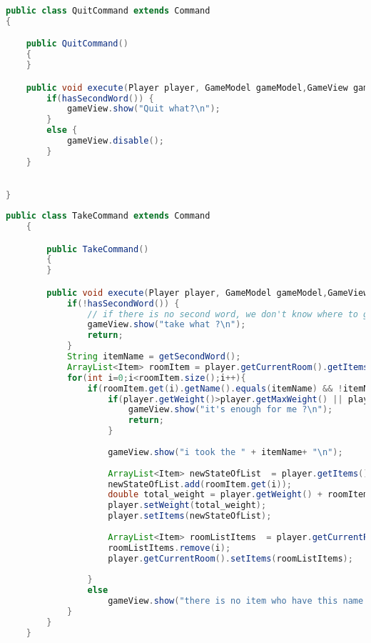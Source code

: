 \documentclass[a4paper , 10pt]{article}
\begin{document}
\begin{lstlisting}[language=Java, caption={Quitcommand}]
    public class QuitCommand extends Command
{

    public QuitCommand()
    {
    }

    public void execute(Player player, GameModel gameModel,GameView gameView){
        if(hasSecondWord()) {
            gameView.show("Quit what?\n");
        }
        else {
            gameView.disable();    
        }
    }

    
}

\end{lstlisting}
\begin{lstlisting}[language=Java, caption={Takecommand}]
public class TakeCommand extends Command
    {

        public TakeCommand()
        {
        }

        public void execute(Player player, GameModel gameModel,GameView gameView){
            if(!hasSecondWord()) {
                // if there is no second word, we don't know where to go...
                gameView.show("take what ?\n");
                return;
            }
            String itemName = getSecondWord();
            ArrayList<Item> roomItem = player.getCurrentRoom().getItems();
            for(int i=0;i<roomItem.size();i++){
                if(roomItem.get(i).getName().equals(itemName) && !itemName.equals("magic_cookie")) {
                    if(player.getWeight()>player.getMaxWeight() || player.getItems().size() > 5) {
                        gameView.show("it's enough for me ?\n");
                        return;
                    }
    
                    gameView.show("i took the " + itemName+ "\n");
    
                    ArrayList<Item> newStateOfList  = player.getItems();
                    newStateOfList.add(roomItem.get(i));
                    double total_weight = player.getWeight() + roomItem.get(i).getWeight();
                    player.setWeight(total_weight);
                    player.setItems(newStateOfList);
    
                    ArrayList<Item> roomListItems  = player.getCurrentRoom().getItems();
                    roomListItems.remove(i);
                    player.getCurrentRoom().setItems(roomListItems);
    
                }
                else
                    gameView.show("there is no item who have this name in this room \n");
            }
        }
    }
    
\end{lstlisting}
\end{document}

